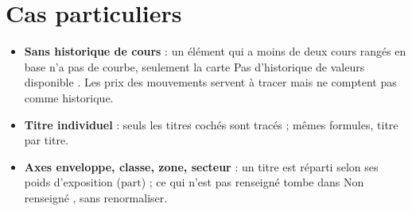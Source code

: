 \documentclass[11pt,a4paper]{article}
\begin{document}
\section{Cas particuliers}

\begin{itemize}
  \item \textbf{Sans historique de cours} : un élément qui a moins de deux cours rangés en base n'a pas de courbe,
        seulement la carte \og Pas d'historique de valeurs disponible \fg. Les prix des mouvements servent à tracer
        mais ne comptent pas comme historique.
  \item \textbf{Titre individuel} : seuls les titres cochés sont tracés ; mêmes formules, titre par titre.
  \item \textbf{Axes enveloppe, classe, zone, secteur} : un titre est réparti selon ses poids d'exposition
        ($\mathrm{part}$) ; ce qui n'est pas renseigné tombe dans \og Non renseigné \fg, sans renormaliser.
\end{itemize}
\end{document}
